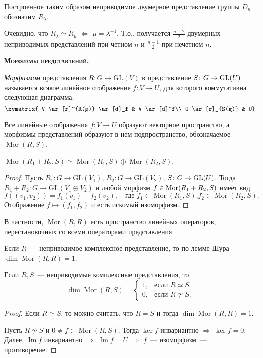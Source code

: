 \documentclass[a4paper]{article}
\newcommand*{\tema}[1]{\vspace{20pt}
\begin{center}{\textbf{\textsc{#1.}}}\vspace{5pt}
\end{center}}
\newcommand{\Mor}{\mathop{\mathrm{Mor}}\nolimits}
\renewcommand{\Im}{\mathop{\mathrm{Im}}\nolimits}
\newcommand*{\p}[1]{#1\nobreak\discretionary{}{\hbox{$\mathsurround=0pt #1$}}{}}
\begin{document}
Построенное таким образом неприводимое двумерное представление
группы $D_n$ обозначим $R_\lambda$.

Очевидно, что $R_\lambda\simeq R_\mu$ $\Leftrightarrow$
$\mu=\lambda^{\pm1}$. Т.о., получается $\frac{n-2}{2}$ двумерных
неприводимых представлений при четном $n$ и $\frac{n-1}{2}$ при
нечетном $n$.

\tema{Морфизмы представлений}

\emph{Морфизмом} представления $R\colon G\to \mathrm{GL}(V)$ в
представление $S\colon G\p\to \mathrm{GL}(U)$ называется всякое
линейное отображение $f\colon V\to U$, для которого коммутативна
следующая диаграмма:
$$\xymatrix{
 V \ar[r]^{R(g)} \ar[d]_f & V \ar[d]^f\\
 U \ar[r]_{S(g)} & U}$$

Все линейные отображения $f\colon V\to U$ образуют векторное
пространство, а морфизмы представлений образуют в нем
подпространство, обозначаемое $\Mor(R,S)$.

\begin{predl}
$\Mor(R_1+R_2,S)\simeq \Mor(R_1,S)\oplus\Mor(R_2,S)$.
\end{predl}

\begin{proof}
Пусть $R_1\colon G\to \mathrm{GL}(V_1)$, $R_2\colon G\to
\mathrm{GL}(V_2)$, $S\colon G\p\to \mathrm{GL}(U)$. Тогда
$R_1+R_2\colon G\to \mathrm{GL}(V_1\oplus V_2)$ и любой морфизм
$f\p\in\Mor(R_1+R_2,S)$ имеет вид
$$f((v_1,v_2))=f_1(v_1)+f_2(v_2), \quad \text{где $f_1\in \Mor(R_1,S)$,
$f_2\in\Mor(R_2,S)$.}$$ Отображение $f\mapsto (f_1,f_2)$ и есть
искомый изоморфизм.
\end{proof}

В частности, $\Mor(R,R)$ есть пространство линейных операторов,
перестановочных со всеми операторами представления.

Если $R$~--- неприводимое комплексное представление, то по лемме
Шура $\dim\Mor(R,R)=1$.

\begin{theorem}
\label{3.XIII}Если $R,S$~--- неприводимые комплексные представления,
то
$$\dim\Mor(R,S)=
\begin{cases}
1,&\text{если $R\simeq S$}\\
0,&\text{если $R\not\simeq S$}.
\end{cases}$$
\end{theorem}

\begin{proof}
Если $R\simeq S$, то можно считать, что $R=S$ и тогда
$\dim\Mor(R,R)=1$.

Пусть $R\not\simeq S$ и $0\neq f\in\Mor(R,S)$. Тогда $\ker f$
инвариантно $\Rightarrow$ $\ker f=0$. Далее, $\Im f$ инвариантно
$\Rightarrow$ $\Im f=U$ $\Rightarrow$ $f$~--- изоморфизм~---
противоречие.
\end{proof}
\end{document}
